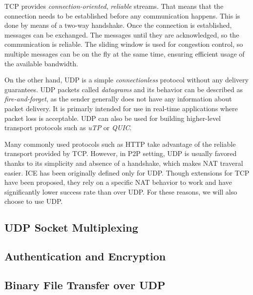 TCP provides \textit{connection-oriented}, \textit{reliable} streams. That means that the connection needs to be established before any communication happens. This is done by means of a two-way handshake. Once the connection is established, messages can be exchanged. The messages until they are acknowledged, so the communication is reliable. The sliding window is used for congestion control, so multiple messages can be on the fly at the same time, ensuring efficient usage of the available bandwidth.

On the other hand, UDP is a simple \textit{connectionless} protocol without any delivery guarantees. UDP packets called \textit{datagrams} and its behavior can be described as \textit{fire-and-forget}, as the sender generally does not have any information about packet delivery. It is primarly intended for use in real-time applications where packet loss is acceptable. UDP can also be used for building higher-level transport protocols such as \textit{uTP} or \textit{QUIC}.

Many commonly used protocols such as HTTP take advantage of the reliable transport provided by TCP. However, in P2P setting, UDP is usually favored thanks to its simplicity and absence of a handshake, which makes NAT traveral easier. ICE has been originally defined only for UDP. Though extensions for TCP have been proposed, they rely on a specific NAT behavior to work and have significantly lower success rate than over UDP. For these reasons, we will also choose to use UDP.

\subsection{UDP Socket Multiplexing}



\subsection{Authentication and Encryption}

\subsection{Binary File Transfer over UDP}





